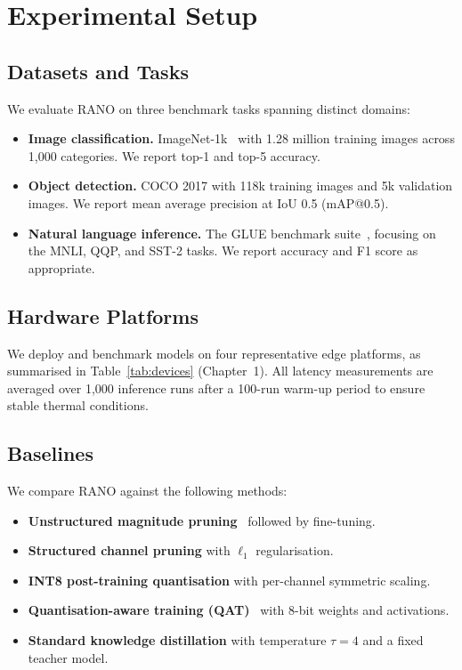 \section{Experimental Setup}

\subsection{Datasets and Tasks}

We evaluate RANO on three benchmark tasks spanning distinct domains:

\begin{itemize}
  \item \textbf{Image classification.} ImageNet-1k~\cite{goodfellow2016}
  with 1.28 million training images across 1,000 categories. We report
  top-1 and top-5 accuracy.

  \item \textbf{Object detection.} COCO 2017 with 118k training images
  and 5k validation images. We report mean average precision at IoU 0.5
  (mAP@0.5).

  \item \textbf{Natural language inference.} The GLUE benchmark
  suite~\cite{devlin2019bert}, focusing on the MNLI, QQP, and SST-2
  tasks. We report accuracy and F1 score as appropriate.
\end{itemize}

\subsection{Hardware Platforms}

We deploy and benchmark models on four representative edge platforms,
as summarised in Table~\ref{tab:devices} (Chapter~1). All latency
measurements are averaged over 1,000 inference runs after a 100-run
warm-up period to ensure stable thermal conditions.

\subsection{Baselines}

We compare RANO against the following methods:

\begin{itemize}
  \item \textbf{Unstructured magnitude pruning}~\cite{goodfellow2016}
  followed by fine-tuning.
  \item \textbf{Structured channel pruning} with $\ell_1$ regularisation.
  \item \textbf{INT8 post-training quantisation} with per-channel
  symmetric scaling.
  \item \textbf{Quantisation-aware training (QAT)}~\cite{kingma2014adam}
  with 8-bit weights and activations.
  \item \textbf{Standard knowledge distillation} with temperature
  $\tau = 4$ and a fixed teacher model.
\end{itemize}

